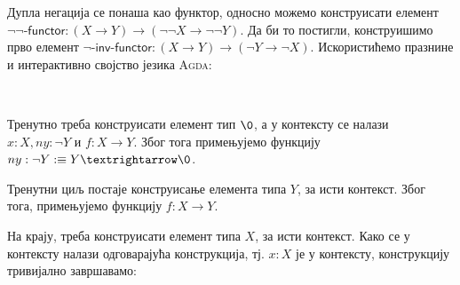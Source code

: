 Дупла негација се понаша као функтор, односно можемо конструисати елемент $\neg\neg$-$\mathsf{functor} : (X \to Y) \to (\neg \neg X \to \neg \neg Y)$. Да би то постигли, конструишимо прво елемент $\neg$-$\mathsf{inv}$-$\mathsf{functor} : (X \to Y) \to (\neg Y \to \neg X)$. Искористићемо празнине и интерактивно својство језика \textsc{Agda}:
\begin{code}%
\>[0]\AgdaSpace{}%
\AgdaSymbol{:}\AgdaSpace{}%
\AgdaSymbol{\{}\AgdaSpace{}%
\AgdaSymbol{:}\AgdaSpace{}%
\AgdaSpace{}%
\AgdaSpace{}%
\AgdaSymbol{\}}\AgdaSpace{}%
\AgdaSymbol{\{}\AgdaSpace{}%
\AgdaSymbol{:}\AgdaSpace{}%
\AgdaSpace{}%
\AgdaSpace{}%
\AgdaSymbol{\}}\AgdaSpace{}%
\AgdaSpace{}%
\AgdaSymbol{(}\AgdaSpace{}%
\AgdaSpace{}%
\AgdaSymbol{)}\AgdaSpace{}%
\AgdaSpace{}%
\AgdaSymbol{(}\AgdaSpace{}%
\AgdaSpace{}%
\AgdaSpace{}%
\AgdaSpace{}%
\AgdaSymbol{)}\<%
\\
\>[0]\AgdaSpace{}%
\AgdaSpace{}%
\AgdaSpace{}%
\AgdaSpace{}%
\AgdaSymbol{=}\AgdaSpace{}%
\AgdaHole{\{!\ \ \ !\}}\<%
\end{code}   
Тренутно треба конструисати елемент тип $\0$, а у контексту се налази $x : X, ny : \neg Y$ и $f : X \to Y$. Због тога примењујемо функцију $ny : \neg Y :\equiv Y → \0$.
\begin{code}%
\>[0]\AgdaSpace{}%
\AgdaSpace{}%
\AgdaSpace{}%
\AgdaSpace{}%
\AgdaSymbol{=}\AgdaSpace{}%
\AgdaSpace{}%
\AgdaHole{\{!\ \ \ !\}}\<%
\end{code}
Тренутни циљ постаје конструисање елемента типа $Y$, за исти контекст. Због тога, примењујемо функцију $f : X \to Y$.
\begin{code}%
\>[0]\AgdaSpace{}%
\AgdaSpace{}%
\AgdaSpace{}%
\AgdaSpace{}%
\AgdaSymbol{=}\AgdaSpace{}%
\AgdaSpace{}%
\AgdaSymbol{(}\AgdaSpace{}%
\AgdaHole{\{!\ \ \ !\}}\AgdaSymbol{)}\<%
\end{code}
На крају, треба конструисати елемент типа $X$, за исти контекст. Како се у контексту налази одговарајућа конструкција, тј. $x : X$ је у контексту, конструкцију тривијално завршавамо:
\begin{code}%
\>[0]\AgdaSpace{}%
\AgdaSpace{}%
\AgdaSpace{}%
\AgdaSpace{}%
\AgdaSymbol{=}\AgdaSpace{}%
\AgdaSpace{}%
\AgdaSymbol{(}\AgdaSpace{}%
\AgdaSymbol{)}\<%
\end{code}
